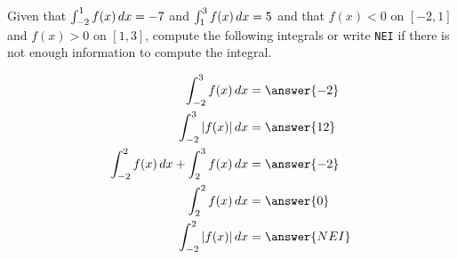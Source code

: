 \documentclass{ximera}
\author{Nela Lakos \and Kyle Parsons}
\begin{document}
\begin{exercise}

Given that $\int_{-2}^1 f(x) \mathop{}\!d x = -7$ and $\int_1^3 f(x) \mathop{}\!d x = 5$ and that $f(x) < 0$ on $[-2,1]$ and $f(x) > 0$ on $[1,3]$,  compute the following integrals or write \verb|NEI| if there is not enough information to compute the integral.

\begin{align*}
\int_{-2}^3 f(x) \d x &= \answer{-2}\\
\int_{-2}^3 \left|f(x)\right| \d x &= \answer{12}\\
\int_{-2}^2 f(x) \d x + \int_2^3 f(x) \d x &= \answer{-2}\\
\int_2^2 f(x) \d x &= \answer{0}\\
\int_{-2}^2 \left|f(x)\right| \d x &= \answer{NEI}
\end{align*}

\end{exercise}
\end{document}
